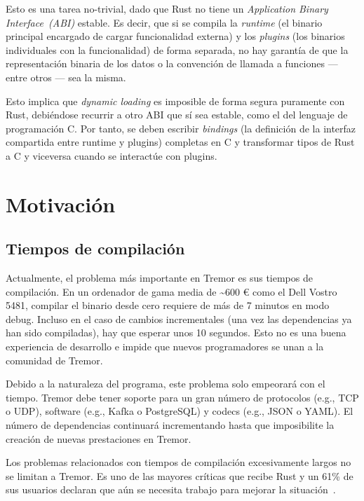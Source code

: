 Esto es una tarea no-trivial, dado que Rust no tiene un \emph{Application Binary
Interface~(ABI)} estable. Es decir, que si se compila la \emph{runtime} (el
binario principal encargado de cargar funcionalidad externa) y los
\emph{plugins} (los binarios individuales con la funcionalidad) de forma
separada, no hay garantía de que la representación binaria de los datos o la
convención de llamada a funciones --- entre otros --- sea la misma.

Esto implica que \emph{dynamic loading} es imposible de forma segura puramente
con Rust, debiéndose recurrir a otro ABI que sí sea estable, como el del
lenguaje de programación C. Por tanto, se deben escribir \emph{bindings} (la
definición de la interfaz compartida entre runtime y plugins) completas en C y
transformar tipos de Rust a C y viceversa cuando se interactúe con plugins.

\section{Motivación}

\subsection{Tiempos de compilación}

Actualmente, el problema más importante en Tremor es sus tiempos de compilación.
En un ordenador de gama media de \~{}600 € como el Dell Vostro 5481, compilar el
binario  desde cero requiere de más de 7 minutos en modo debug.
Incluso en el caso de cambios incrementales (una vez las dependencias ya han
sido compiladas), hay que esperar unos 10 segundos. Esto no es una buena
experiencia de desarrollo e impide que nuevos programadores se unan a la
comunidad de Tremor.

Debido a la naturaleza del programa, este problema solo empeorará con el tiempo.
Tremor debe tener soporte para un gran número de protocolos (e.g., TCP o UDP),
software (e.g., Kafka o PostgreSQL) y codecs (e.g., JSON o YAML). El número de
dependencias continuará incrementando hasta que imposibilite la creación de
nuevas prestaciones en Tremor.

Los problemas relacionados con tiempos de compilación excesivamente largos no se
limitan a Tremor. Es uno de las mayores críticas que recibe Rust y un 61\% de
sus usuarios declaran que aún se necesita trabajo para mejorar la
situación~\cite{rustsurvey}.

